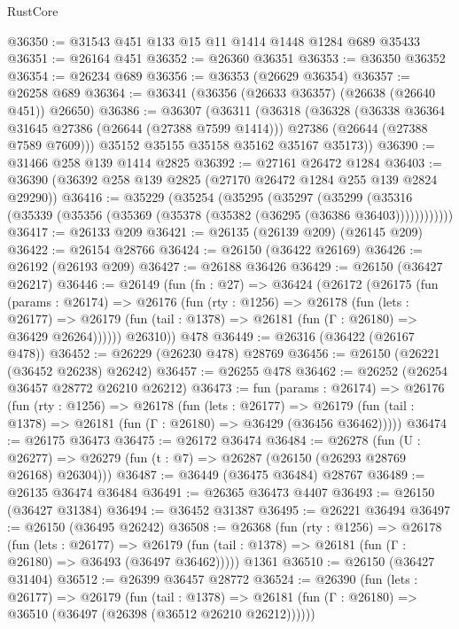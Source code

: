 \begin{lexlean}{RustCore}
\begin{coremodule}
@36350 := @31543 @451 @133 @15 @11 @1414 @1448 @1284 @689 @35433
@36351 := @26164 @451
@36352 := @26360 @36351
@36353 := @36350 @36352
@36354 := @26234 @689
@36356 := @36353 (@26629 @36354)
@36357 := @26258 @689
@36364 := @36341 (@36356 (@26633 @36357) (@26638 (@26640 @451)) @26650)
@36386 := @36307
    (@36311
      (@36318
        (@36328
          (@36338 @36364 @31645 @27386 (@26644 (@27388 @7599 @1414)))
          @27386
          (@26644 (@27388 @7589 @7609)))
        @35152
        @35155
        @35158
        @35162
        @35167
        @35173))
@36390 := @31466 @258 @139 @1414 @2825
@36392 := @27161 @26472 @1284
@36403 := @36390 (@36392 @258 @139 @2825 (@27170 @26472 @1284 @255 @139 @2824 @29290))
@36416 := @35229
    (@35254
      (@35295
        (@35297
          (@35299 (@35316 (@35339 (@35356 (@35369 (@35378 (@35382 (@36295 (@36386 @36403))))))))))))
@36417 := @26133 @209
@36421 := @26135 (@26139 @209) (@26145 @209)
@36422 := @26154 @28766
@36424 := @26150 (@36422 @26169)
@36426 := @26192 (@26193 @209)
@36427 := @26188 @36426
@36429 := @26150 (@36427 @26217)
@36446 := @26149
    (fun (fn : @27) =>
    @36424
      (@26172
        (@26175
          (fun (params : @26174) =>
          @26176
            (fun (rty : @1256) =>
            @26178
              (fun (lets : @26177) =>
              @26179 (fun (tail : @1378) => @26181 (fun (Γ : @26180) => @36429 @26264))))))
        @26310))
    @478
@36449 := @26316 (@36422 (@26167 @478))
@36452 := @26229 (@26230 @478) @28769
@36456 := @26150 (@26221 (@36452 @26238) @26242)
@36457 := @26255 @478
@36462 := @26252 (@26254 @36457 @28772 @26210 @26212)
@36473 := fun (params : @26174) =>
  @26176
    (fun (rty : @1256) =>
    @26178
      (fun (lets : @26177) =>
      @26179 (fun (tail : @1378) => @26181 (fun (Γ : @26180) => @36429 (@36456 @36462)))))
@36474 := @26175 @36473
@36475 := @26172 @36474
@36484 := @26278
    (fun (U : @26277) => @26279 (fun (t : @7) => @26287 (@26150 (@26293 @28769 @26168) @26304)))
@36487 := @36449 (@36475 @36484) @28767
@36489 := @26135 @36474 @36484
@36491 := @26365 @36473 @4407
@36493 := @26150 (@36427 @31384)
@36494 := @36452 @31387
@36495 := @26221 @36494
@36497 := @26150 (@36495 @26242)
@36508 := @26368
    (fun (rty : @1256) =>
    @26178
      (fun (lets : @26177) =>
      @26179 (fun (tail : @1378) => @26181 (fun (Γ : @26180) => @36493 (@36497 @36462)))))
    @1361
@36510 := @26150 (@36427 @31404)
@36512 := @26399 @36457 @28772
@36524 := @26390
    (fun (lets : @26177) =>
    @26179
      (fun (tail : @1378) =>
      @26181 (fun (Γ : @26180) => @36510 (@36497 (@26398 (@36512 @26210 @26212))))))

\end{coremodule}
\end{lexlean}

